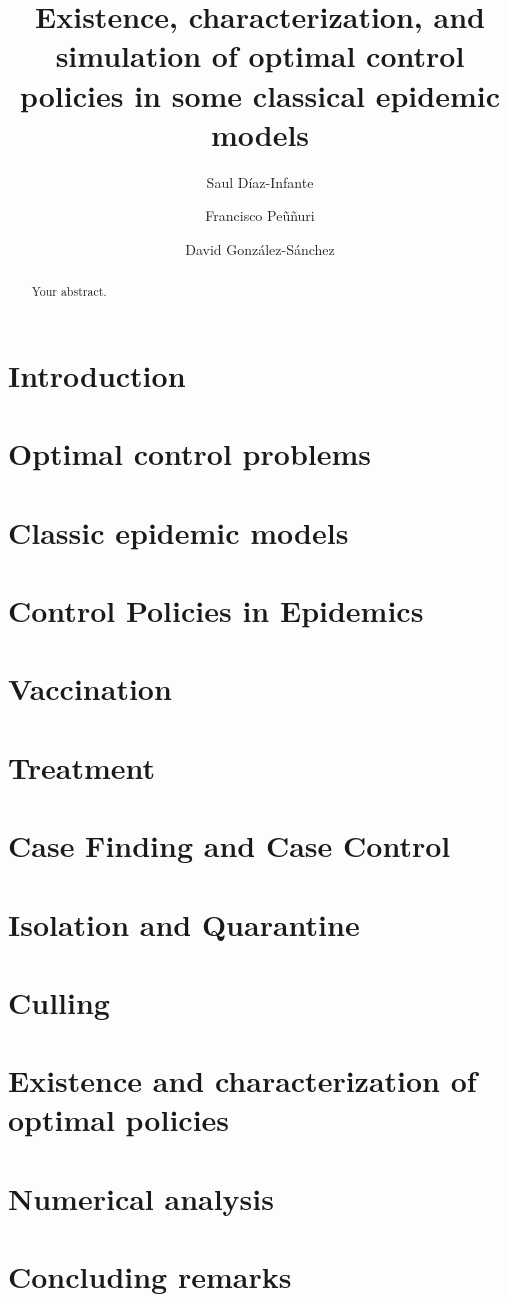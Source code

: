\documentclass[titlepage]{amsart}
\title[%
	Existence, characterization and simulation of OCP for some epidemic 
	Models%
	]{
	Existence, characterization, and simulation
	of optimal control policies in some classical epidemic models
}
\author[D\'iaz-Infante]{Saul D\'iaz-Infante}
\author[Pe\~u\~nuri]{Francisco Pe\~u\~nuri}
\author[Gonz\'alez-S\'anchez]{David Gonz\'alez-S\'anchez}
\begin{document}
  \begin{abstract}
  	Your abstract.
  \end{abstract}
  \maketitle
%
%
  \section{Introduction}
    
  \section{Optimal control problems}
    
  \section{Classic epidemic models}
    
  \section{Control Policies in Epidemics}
    
  \section{Vaccination}
    
  \section{Treatment}
    
  \section{Case Finding and Case Control}
    
  \section{Isolation and Quarantine}
    
  \section{Culling}
    
  \section{Existence and characterization of optimal policies}
  \section{Numerical analysis}
    
  \section{Concluding remarks}
%
%
  
  
\end{document}
